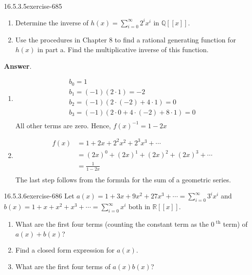 \documentclass[twoside,10pt,]{book}
\numberwithin{equation}{section}
\begin{document}
\begin{divisionsolution}{16.5.3.5}{}{exercise-685}%
\hypertarget{p-6101}{}%
\leavevmode%
\begin{enumerate}[label=(\alph*)]
\item\hypertarget{li-2696}{}\hypertarget{p-6102}{}%
Determine the inverse of \(h(x) = \sum_{i=0}^{\infty } 2^i x^i\)  in \(\mathbb{Q}[[x]]\).%
\item\hypertarget{li-2697}{}\hypertarget{p-6103}{}%
Use the procedures in Chapter 8 to find a rational generating function for \(h(x)\) in part a.  Find the multiplicative inverse of this function.%
\end{enumerate}
%
\par\smallskip%
\noindent\textbf{Answer}.\quad%
\hypertarget{p-6104}{}%
\leavevmode%
\begin{enumerate}[label=(\alph*)]
\item\hypertarget{li-2698}{}\hypertarget{p-6105}{}%
%
\begin{equation*}
\begin{array}{c}
b_0= 1\\
b_1=(-1)(2\cdot 1) = -2\\
b_2=(-1)(2\cdot (-2)+4\cdot 1)= 0\\
b_3= (-1)(2\cdot 0 + 4\cdot (-2)+8\cdot 1)=0\\
\end{array}
\end{equation*}
All other terms are zero.  Hence,  \(f(x)^{-1}= 1-2x\)%
\item\hypertarget{li-2699}{}\hypertarget{p-6106}{}%
%
\begin{equation*}
\begin{split}
f(x) &=1+2x + 2^2x^2+ 2^3x^3+ \cdots \\
&=(2x)^0 + (2x)^1 + (2x)^2+ (2x)^3+\cdots \\
&= \frac{1}{1-2x}\\
\end{split}
\end{equation*}
The last step follows from the formula for the sum of a geometric series.%
\end{enumerate}
%
\end{divisionsolution}%
\begin{divisionsolution}{16.5.3.6}{}{exercise-686}%
\hypertarget{p-6107}{}%
Let \(a(x) = 1 + 3x + 9x^2 + 27x^3 + \cdots =\sum_{i=0}^{\infty } 3^i x^i\) and \(b(x) = 1 + x + x^2+ x^3+\cdots =\sum_{i=0}^{\infty }  x^i\) both in \(\mathbb{R}[[x]]\).\leavevmode%
\begin{enumerate}[label=(\alph*)]
\item\hypertarget{li-2700}{}\hypertarget{p-6108}{}%
What are the first four terms (counting the constant term as the \(0^{\textrm{ th}}\) term) of \(a(x) + b(x)\)?%
\item\hypertarget{li-2701}{}\hypertarget{p-6109}{}%
Find a closed form expression for \(a(x)\).%
\item\hypertarget{li-2702}{}\hypertarget{p-6110}{}%
What are the first four terms of \(a(x) b(x)\)?%
\end{enumerate}
%
\end{divisionsolution}%
\end{document}
